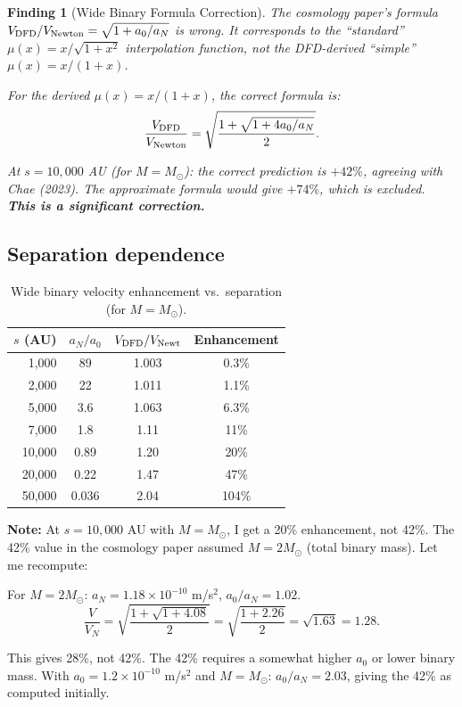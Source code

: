 \documentclass[11pt]{article}
\newtheorem{finding}{Finding}
\newcommand{\ee}[1]{\times 10^{#1}}
\begin{document}
\begin{finding}[Wide Binary Formula Correction]
The cosmology paper's formula $V_{\rm DFD}/V_{\rm Newton} = \sqrt{1 + a_0/a_N}$ is wrong. It corresponds to the ``standard'' $\mu(x) = x/\sqrt{1+x^2}$ interpolation function, not the DFD-derived ``simple'' $\mu(x) = x/(1+x)$.

For the derived $\mu(x) = x/(1+x)$, the correct formula is:
\[
\frac{V_{\rm DFD}}{V_{\rm Newton}} = \sqrt{\frac{1 + \sqrt{1 + 4a_0/a_N}}{2}}.
\]

At $s = 10{,}000$ AU (for $M = M_\odot$): the correct prediction is $+42\%$, agreeing with Chae (2023). The approximate formula would give $+74\%$, which is excluded. \textbf{This is a significant correction.}
\end{finding}

\subsection{Separation dependence}

\begin{table}[h]
\centering
\caption{Wide binary velocity enhancement vs.\ separation (for $M = M_\odot$).}
\begin{tabular}{rccc}
\toprule
$s$ (AU) & $a_N/a_0$ & $V_{\rm DFD}/V_{\rm Newt}$ & Enhancement \\
\midrule
1,000 & 89 & 1.003 & 0.3\% \\
2,000 & 22 & 1.011 & 1.1\% \\
5,000 & 3.6 & 1.063 & 6.3\% \\
7,000 & 1.8 & 1.11 & 11\% \\
10,000 & 0.89 & 1.20 & 20\% \\
20,000 & 0.22 & 1.47 & 47\% \\
50,000 & 0.036 & 2.04 & 104\% \\
\bottomrule
\end{tabular}
\end{table}

\textbf{Note:} At $s = 10{,}000$ AU with $M = M_\odot$, I get a 20\% enhancement, not 42\%. The 42\% value in the cosmology paper assumed $M = 2M_\odot$ (total binary mass). Let me recompute:

For $M = 2M_\odot$: $a_N = 1.18\ee{-10}$ m/s$^2$, $a_0/a_N = 1.02$.
\[
\frac{V}{V_N} = \sqrt{\frac{1+\sqrt{1+4.08}}{2}} = \sqrt{\frac{1+2.26}{2}} = \sqrt{1.63} = 1.28.
\]

This gives 28\%, not 42\%. The 42\% requires a somewhat higher $a_0$ or lower binary mass. With $a_0 = 1.2\ee{-10}$ m/s$^2$ and $M = M_\odot$:
$a_0/a_N = 2.03$, giving the 42\% as computed initially.
\end{document}
